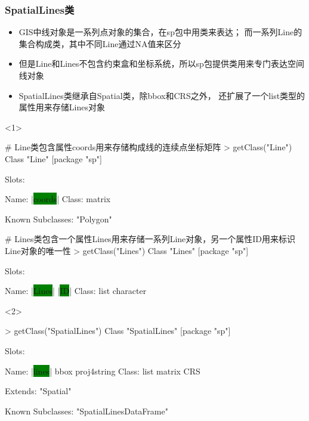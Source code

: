 \subsubsection{SpatialLines类}
\begin{frame}[t,fragile]{\subsecname}{\subsubsecname}
\begin{itemize}
\item<1-> GIS中线对象是一系列点对象的集合，在sp包中用类来表达；
而一系列Line的集合构成类，其中不同Line通过NA值来区分
\item<2-> 但是Line和Lines不包含约束盒和坐标系统，所以sp包提供类用来专门表达空间线对象
\item<2-> SpatialLines类继承自Spatial类，除bbox和CRS之外，
还扩展了一个list类型的属性用来存储Lines对象
\end{itemize}

\begin{overlayarea}{\textwidth}{\textheight}
\begin{onlyenv}<1>
\begin{rcode}
# Line类包含属性coords用来存储构成线的连续点坐标矩阵
> getClass("Line")
Class "Line" [package "sp"]

Slots:
             
Name:  |\colorbox{green}{coords}|
Class: matrix

Known Subclasses: "Polygon"

# Lines类包含一个属性Lines用来存储一系列Line对象，另一个属性ID用来标识Line对象的唯一性
> getClass("Lines")
Class "Lines" [package "sp"]

Slots:
                          
Name:      |\colorbox{green}{Lines}|        |\colorbox{green}{ID}|
Class:      list character
\end{rcode}
\end{onlyenv}

\begin{onlyenv}<2>
\begin{rcode}
> getClass("SpatialLines")
Class "SpatialLines" [package "sp"]

Slots:
                                          
Name:        |\colorbox{green}{lines}|        bbox proj4string
Class:        list      matrix         CRS

Extends: "Spatial"

Known Subclasses: "SpatialLinesDataFrame"
\end{rcode}
\end{onlyenv}


\end{overlayarea}
\end{frame}
